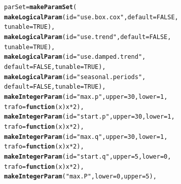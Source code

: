 \documentclass[12pt]{article}\usepackage[]{graphicx}\usepackage[]{color}
\makeatletter
\newcommand{\hlnum}[1]{\textcolor[rgb]{0.686,0.059,0.569}{#1}}%
\newcommand{\hlstr}[1]{\textcolor[rgb]{0.192,0.494,0.8}{#1}}%
\newcommand{\hlopt}[1]{\textcolor[rgb]{0,0,0}{#1}}%
\newcommand{\hlstd}[1]{\textcolor[rgb]{0.345,0.345,0.345}{#1}}%
\newcommand{\hlkwa}[1]{\textcolor[rgb]{0.161,0.373,0.58}{\textbf{#1}}}%
\newcommand{\hlkwb}[1]{\textcolor[rgb]{0.69,0.353,0.396}{#1}}%
\newcommand{\hlkwc}[1]{\textcolor[rgb]{0.333,0.667,0.333}{#1}}%
\newcommand{\hlkwd}[1]{\textcolor[rgb]{0.737,0.353,0.396}{\textbf{#1}}}%
\newenvironment{kframe}{%
 \def\at@end@of@kframe{}%
 \ifinner\ifhmode%
  \def\at@end@of@kframe{\end{minipage}}%
  \begin{minipage}{\columnwidth}%
 \fi\fi%
 \def\FrameCommand##1{\hskip\@totalleftmargin \hskip-\fboxsep
 \colorbox{shadecolor}{##1}\hskip-\fboxsep
     \hskip-\linewidth \hskip-\@totalleftmargin \hskip\columnwidth}%
 \MakeFramed {\advance\hsize-\width
   \@totalleftmargin\z@ \linewidth\hsize
   \@setminipage}}%
 {\par\unskip\endMakeFramed%
 \at@end@of@kframe}
\newenvironment{knitrout}{}{} %
\theoremstyle{definition}
\makeatother
\begin{document}
\singlespacing                                      
\begin{knitrout}
\color{fgcolor}\begin{kframe}
\begin{alltt}
\hlstd{parSet} \hlkwb{=} \hlkwd{makeParamSet}\hlstd{(}
           \hlkwd{makeLogicalParam}\hlstd{(}\hlkwc{id} \hlstd{=} \hlstr{"use.box.cox"}\hlstd{,}\hlkwc{default} \hlstd{=} \hlnum{FALSE}\hlstd{,}
                            \hlkwc{tunable} \hlstd{=} \hlnum{TRUE}\hlstd{),}
           \hlkwd{makeLogicalParam}\hlstd{(}\hlkwc{id} \hlstd{=} \hlstr{"use.trend"}\hlstd{,} \hlkwc{default} \hlstd{=} \hlnum{FALSE}\hlstd{,}
                            \hlkwc{tunable} \hlstd{=} \hlnum{TRUE}\hlstd{),}
           \hlkwd{makeLogicalParam}\hlstd{(}\hlkwc{id} \hlstd{=} \hlstr{"use.damped.trend"}\hlstd{,}
                            \hlkwc{default} \hlstd{=} \hlnum{FALSE}\hlstd{,} \hlkwc{tunable} \hlstd{=} \hlnum{TRUE}\hlstd{),}
           \hlkwd{makeLogicalParam}\hlstd{(}\hlkwc{id} \hlstd{=} \hlstr{"seasonal.periods"}\hlstd{,}
                            \hlkwc{default} \hlstd{=} \hlnum{FALSE}\hlstd{,} \hlkwc{tunable} \hlstd{=} \hlnum{TRUE}\hlstd{),}
           \hlkwd{makeIntegerParam}\hlstd{(}\hlkwc{id} \hlstd{=} \hlstr{"max.p"}\hlstd{,} \hlkwc{upper} \hlstd{=} \hlnum{30}\hlstd{,} \hlkwc{lower} \hlstd{=} \hlnum{1}\hlstd{,}
                            \hlkwc{trafo} \hlstd{=} \hlkwa{function}\hlstd{(}\hlkwc{x}\hlstd{) x}\hlopt{*}\hlnum{2}\hlstd{),}
           \hlkwd{makeIntegerParam}\hlstd{(}\hlkwc{id} \hlstd{=} \hlstr{"start.p"}\hlstd{,} \hlkwc{upper} \hlstd{=} \hlnum{30}\hlstd{,} \hlkwc{lower}\hlstd{=} \hlnum{1}\hlstd{,}
                            \hlkwc{trafo} \hlstd{=} \hlkwa{function}\hlstd{(}\hlkwc{x}\hlstd{) x}\hlopt{*}\hlnum{2}\hlstd{),}
           \hlkwd{makeIntegerParam}\hlstd{(}\hlkwc{id} \hlstd{=} \hlstr{"max.q"}\hlstd{,} \hlkwc{upper} \hlstd{=} \hlnum{30}\hlstd{,} \hlkwc{lower} \hlstd{=} \hlnum{1}\hlstd{,}
                            \hlkwc{trafo} \hlstd{=} \hlkwa{function}\hlstd{(}\hlkwc{x}\hlstd{) x}\hlopt{*}\hlnum{2}\hlstd{),}
           \hlkwd{makeIntegerParam}\hlstd{(}\hlkwc{id} \hlstd{=} \hlstr{"start.q"}\hlstd{,} \hlkwc{upper} \hlstd{=} \hlnum{5}\hlstd{,} \hlkwc{lower} \hlstd{=} \hlnum{0}\hlstd{,}
                            \hlkwc{trafo} \hlstd{=} \hlkwa{function}\hlstd{(}\hlkwc{x}\hlstd{) x}\hlopt{*}\hlnum{2}\hlstd{),}
           \hlkwd{makeIntegerParam}\hlstd{(}\hlstr{"max.P"}\hlstd{,} \hlkwc{lower} \hlstd{=} \hlnum{0}\hlstd{,} \hlkwc{upper} \hlstd{=} \hlnum{5}\hlstd{),}

\end{alltt}
\end{kframe}
\end{knitrout}
\end{document}
